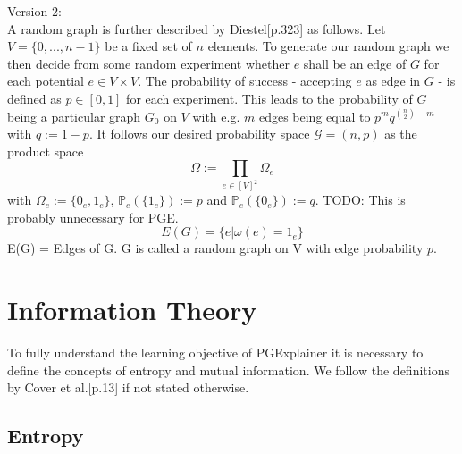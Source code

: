 Version 2: \\
A random graph is further described by Diestel\cite{Diestel2017}[p.323] as follows. Let $V = \{0,...,n-1\}$ be a fixed set of $n$ elements. To generate our random graph we then decide from some random experiment whether $e$ shall be an edge of $G$ for each potential $e \in V \times V$. The probability of success - accepting $e$ as edge in $G$ - is defined as $p \in [0,1]$ for each experiment. This leads to the probability of $G$ being a particular graph $G_0$ on $V$ with e.g. $m$ edges being equal to $p^m q^{\binom{n}{2}-m}$ with $q:=1-p$. It follows our desired probability space $\mathcal{G}=(n,p)$ as the product space
\begin{equation}
    \Omega := \prod_{e \in [V]^2} \Omega_e
\end{equation}
with $\Omega_e := \{0_e,1_e\}$, $\mathbb{P}_e(\{1_e\}) := p$ and $\mathbb{P}_e(\{0_e\}) := q$.
TODO: This is probably unnecessary for PGE.
\begin{equation}
    E(G) = \{e | \omega(e) = 1_e\}
\end{equation}
E(G) = Edges of G. G is called a random graph on V with edge probability $p$. \bigskip


\section{Information Theory}
To fully understand the learning objective of PGExplainer it is necessary to define the concepts of entropy and mutual information. We follow the definitions by Cover et al.\cite{Cover2005}[p.13] if not stated otherwise.

\subsection{Entropy}

